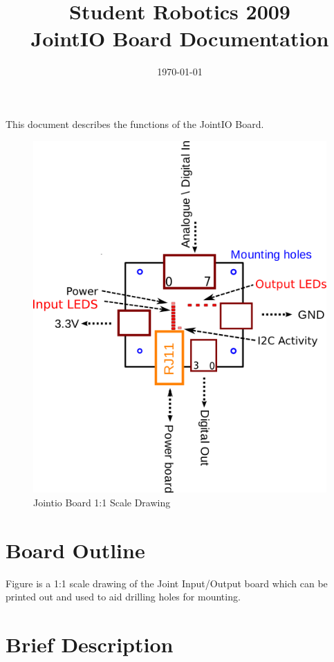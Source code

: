 \documentclass[a4paper, 12pt]{article}
\title {Student Robotics 2009\\ JointIO Board Documentation}
\date{\today}
\begin{document}
\maketitle

\noindent This document describes the functions of the JointIO Board. 

\begin{figure}
\centering
\includegraphics[scale=1, angle=0]{outline}
\caption{Jointio Board 1:1 Scale Drawing}
\label{fig:outline}
\end{figure}


\section{Board Outline}
Figure \label{fig:outline} is a 1:1 scale drawing of the Joint Input/Output board which can be printed out and used to aid drilling holes for mounting.
\label{sec:outline}

\section{Brief Description}
\end{document}
